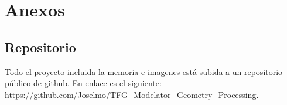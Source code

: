 \chapter{ Anexos}



\section{ Repositorio}

Todo el proyecto incluida la memoria e imagenes está subida a un repositorio público de github. En enlace es el siguiente:\\ \href{https://github.com/Joselmo/TFG_Modelator_Geometry_Processing}{https://github.com/Joselmo/TFG\_Modelator\_Geometry\_Processing}.
